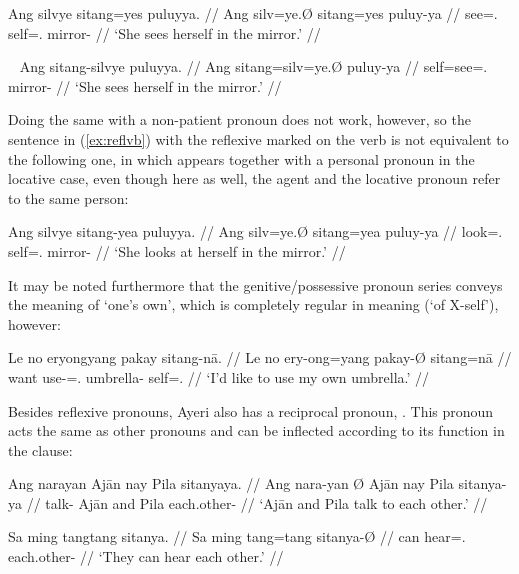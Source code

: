 \ex\label{ex:reflpat}\begingl
	\gla Ang silvye sitang=yes puluyya. //
	\glb Ang silv=ye.Ø sitang=yes puluy-ya //
	\glc \AgtT{} see=\TsgF{}.\Top{} self=\TsgF{}.\Parg{} mirror-\Loc{} //
	\glft `She sees herself in the mirror.' //
\endgl\xe

\ex~\label{ex:reflvb}\begingl
	\gla Ang sitang-silvye puluyya. //
	\glb Ang sitang=silv=ye.Ø puluy-ya //
	\glc \AgtT{} self=see=\TsgF{}.\Top{} mirror-\Loc{} //
	\glft `She sees herself in the mirror.' //
\endgl\xe

Doing the same with a non-patient pronoun does not work, however, so the 
sentence in (\ref{ex:reflvb}) with the reflexive  marked 
on the verb is not equivalent to the following one, in which 
 appears together with a personal pronoun in the locative 
case, even though here as well, the agent and the locative pronoun refer to the 
same person:

\ex\label{ex:reflloc}\begingl
	\gla Ang silvye sitang-yea puluyya. //
	\glb Ang silv=ye.Ø sitang=yea puluy-ya //
	\glc \AgtT{} look=\TsgF{}.\Top{} self=\TsgF{}.\Loc{} mirror-\Loc{} //
	\glft `She looks at herself in the mirror.' //
\endgl\xe

It may be noted furthermore that the genitive/possessive pronoun series conveys 
the meaning of `one's own', which is completely regular in meaning (`of 
X-self'), however:

\ex\begingl
	\gla Le no eryongyang pakay sitang-nā. //
	\glb Le no ery-ong=yang pakay-Ø sitang=nā //
	\glc \PatTI{} want use-\Irr{}=\Fsg{}.\Aarg{} umbrella-\Top{} 
		self=\Fsg{}.\Gen{} //
	\glft `I'd like to use my own umbrella.' //
\endgl\xe



Besides reflexive pronouns, Ayeri also has a reciprocal pronoun, 
. This pronoun acts the same as other pronouns 
and can be inflected according to its function in the clause:

\pex
\a\begingl
	\gla Ang narayan {} Ajān nay Pila sitanyaya. //
	\glb Ang nara-yan Ø Ajān nay Pila sitanya-ya //
	\glc \AgtT{} talk-\TplM{} \Top{} Ajān and Pila each.other-\Loc{} //
	\glft `Ajān and Pila talk to each other.' //
\endgl

\a\begingl
	\gla Sa ming tangtang sitanya. //
	\glb Sa ming tang=tang sitanya-Ø //
	\glc \PatT{} can hear=\TplM{}.\Aarg{} each.other-\Top{} //
	\glft `They can hear each other.' //
\endgl

